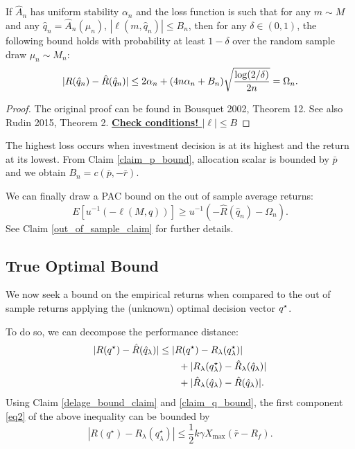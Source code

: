 \documentclass[11pt]{article}
\begin{document}
\begin{thm}
  \label{thm2}
  If $\hat A_n$ has uniform stability $\alpha_n$ and the loss function is such that for
  any $m\sim M$ and any $\hat q_n=\hat A_n(\mu_n)$, $|\ell(m,\hat q_n)|\leq B_n$, then for
  any $\delta\in(0,1)$, the following bound holds with probability at least $1-\delta$
  over the random sample draw $\mu_n\sim M_n$:
  \begin{equation*}
    |R({\hat q}_n) - \hat R({\hat q}_n)| \leq 2\alpha_n + (4n\alpha_n +
    B_n)\sqrt{\frac{\log(2/\delta)}{2n}} = \Omega_n.
  \end{equation*}
\end{thm}

\begin{proof}
  The original proof can be found in Bousquet 2002, Theorem 12. See also Rudin 2015,
  Theorem 2. \underline{\textbf{Check conditions! $|\ell|\leq B$}}
\end{proof}

\begin{rem}
  The highest loss occurs when investment decision is at its highest and the return at its
  lowest. From Claim \ref{claim_p_bound}, allocation scalar is bounded by $\bar p$ and we
  obtain $B_n = c(\bar p, -\bar r)$.
\end{rem}

We can finally draw a PAC bound on the out of sample average returns:
\begin{equation}
  E[u^{-1}(-\ell(M,q))] \geq u^{-1}(-\hat R(\hat q_n) - \Omega_n).
\end{equation}
See Claim \ref{out_of_sample_claim} for further details.
 
\subsection{True Optimal Bound}

We now seek a bound on the empirical returns when compared to the out of sample returns
applying the (unknown) optimal decision vector ${q^\star}$. 

To do so, we can decompose the performance distance:
\begin{align}
  |R({q^\star}) - \hat R({\hat q}_\lambda)| &\leq |R({q^\star}) - R_\lambda(q^\star_\lambda)|\label{eq2}\\
                                      &\qquad + |R_\lambda(q^\star_\lambda) - \hat R_\lambda(\hat q_\lambda)|\label{eq3}\\
                                      &\qquad + |\hat R_\lambda(\hat q_\lambda) - \hat R(\hat q_\lambda)|\label{eq4}.
\end{align}
Using Claim \ref{delage_bound_claim} and \ref{claim_q_bound}, the first component
\eqref{eq2} of the above inequality can be bounded by
\begin{equation*}
  |R(q^\star) - R_\lambda(q^\star_\lambda)| \leq \frac{1}{2}k\gamma X_{\max}(\bar r-R_f).
\end{equation*}
\end{document}
